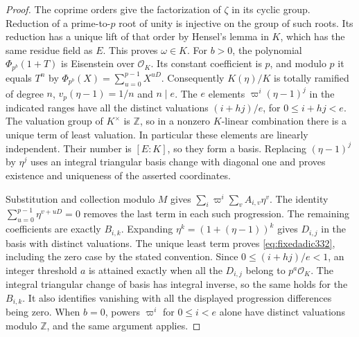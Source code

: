 \documentclass[a4paper,11pt]{article}
\theoremstyle{definition}
\theoremstyle{remark}
\newcommand{\ZZ}{\mathbb Z}\newcommand{\ord}{\operatorname{ord}}
\numberwithin{equation}{section}
\begin{document}
\begin{proof}
The coprime orders give the factorization of \(\zeta\) in its
cyclic group. Reduction of a prime-to-\(p\) root of unity is
injective on the group of such roots. Its reduction has a unique
lift of that order by Hensel's lemma in \(K\), which has the same
residue field as \(E\). This proves \(\omega\in K\).
For \(b>0\), the polynomial \(\Phi_{p^b}(1+T)\) is Eisenstein
over \(\mathcal O_K\). Its constant coefficient is \(p\), and
modulo \(p\) it equals \(T^n\) by
\(\Phi_{p^b}(X)=\sum_{u=0}^{p-1}X^{uD}\). Consequently
\(K(\eta)/K\) is totally ramified of degree \(n\),
\(v_p(\eta-1)=1/n\) and \(n\mid e\).
The \(e\) elements \(\varpi^i(\eta-1)^j\) in the indicated
ranges have all the distinct valuations
\((i+hj)/e\), for \(0\le i+hj<e\).
The valuation group of \(K^\times\) is \(\ZZ\), so in a nonzero
\(K\)-linear combination there is a unique term of least valuation.
In particular these elements are linearly independent. Their number
is \([E:K]\), so they form a basis. Replacing \((\eta-1)^j\) by
\(\eta^j\) uses an integral triangular basis change with diagonal
one and proves existence and uniqueness of the asserted coordinates.

Substitution and collection modulo \(M\) gives \(\sum_i\varpi^i
\sum_v A_{i,v}\eta^v\). The identity
\(\sum_{u=0}^{p-1}\eta^{v+uD}=0\) removes the last term in each
such progression. The remaining coefficients are exactly
\(B_{i,k}\). Expanding \(\eta^k=(1+(\eta-1))^k\) gives
\(D_{i,j}\) in the basis with distinct valuations. The unique
least term proves \eqref{eq:fixedadic332}, including the zero
case by the stated convention. Since \(0\le(i+hj)/e<1\), an
integer threshold \(a\) is attained exactly when all the \(D_{i,j}\)
belong to \(p^a\mathcal O_K\). The integral triangular change of
basis has integral inverse, so the same holds for the \(B_{i,k}\).
It also identifies vanishing with all the displayed progression
differences being zero. When \(b=0\), powers \(\varpi^i\) for
\(0\le i<e\) alone have distinct valuations modulo \(\ZZ\),
and the same argument applies.
\end{proof}
\end{document}
